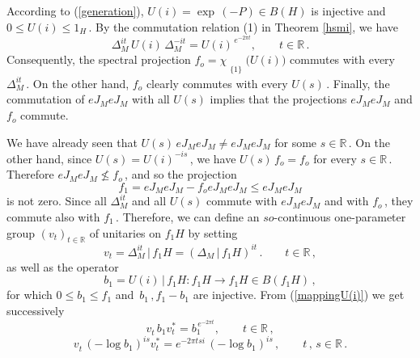 \documentclass[reqno]{amsart}
\theoremstyle{definition}
\theoremstyle{remark}
\numberwithin{equation}{section}
\theoremstyle{plain}
\begin{document}
According to (\ref{generation}), $U(i)=\exp\, (-P)\in B(H)$ is
injective and $0\leq U(i)\leq 1_H\,$. By the commutation relation
(1) in Theorem \ref{hsmi}, we have
\begin{equation}\label{mappingU(i)}
\Delta_M^{it}\, U(i)\, \Delta_M^{-it}=U(i)^{\, e^{-2\pi t}} ,
\qquad t\in \mathbb R\, .
\end{equation}
Consequently, the spectral projection $f_o =
\chi_{\substack{{}\\{\{ 1\}}}} \big( U(i)\big)$ commutes with
every $\Delta_M^{it}\,$. On the other hand, $f_o$ clearly
commutes with every $U(s)\,$. Finally, the commutation of
$eJ_M eJ_M$ with all $U(s)$ implies that the projections $eJ_M eJ_M$
and $f_o$ commute.

We have already seen
that $U(s)\, eJ_M eJ_M\neq eJ_M eJ_M$ for some $s\in\mathbb R\,$.
On the other hand, since $U(s) =U(i)^{-is}\,$, we have
$U(s)\, f_o =f_o$ for every $s\in\mathbb R\,$. Therefore
$eJ_M eJ_M\not\leq f_o\,$, and so the projection
\begin{equation*}
f_1 =eJ_M eJ_M -f_o eJ_M eJ_M\leq eJ_M eJ_M
\end{equation*}
is not zero. Since all $\Delta_M^{it}$ and all $U(s)$ commute
with $eJ_M eJ_M$ and with $f_o\,$, they commute also with $f_1\,$.
Therefore, we can define an $so$-continuous one-parameter group
$(v_t)_{t\in\mathbb R}$ of unitaries on $f_1 H$ by setting
\begin{equation}\label{restr.Delta}
v_t =\Delta_M^{it}\, |\, f_1 H =(\Delta_M\, |\, f_1 H)^{it}\, .
\qquad t\in\mathbb R\, ,
\end{equation}
as well as the operator
\begin{equation*}
b_1 =U(i)\, |\, f_1 H : f_1 H\longrightarrow f_1 H\in B(f_1 H)\, ,
\end{equation*}
for which $0\leq b_1\leq f_1$ and $\, b_1\, , f_1 -b_1$ are
injective. From (\ref{mappingU(i)}) we get successively
\begin{equation*}
v_t^{}\, b_1^{} v_t^*=b_1^{\, e^{-2\pi t}} ,\qquad t\in \mathbb R\, ,
\end{equation*}
\begin{equation*}
v_t^{}\, (-\log b_1 )^{is} v_t^*=e^{-2\pi tsi}\, (-\log b_1 )^{is}
\, ,\qquad t\, ,\, s\in \mathbb R\, .
\end{equation*}
\end{document}
